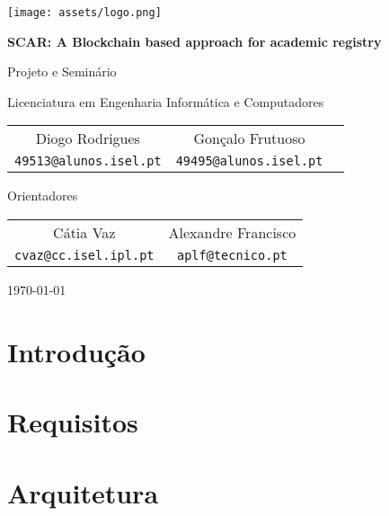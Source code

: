 \documentclass[10pt]{article}
\begin{document}
\begin{center}

\texttt{[image: assets/logo.png]}

\begin{LARGE}
\textbf{SCAR: A Blockchain based approach for academic registry}
\end{LARGE}

\vspace{.75cm} Projeto e Seminário

\vspace{.25cm} Licenciatura em Engenharia Informática e Computadores

\vspace{.75cm}
\begin{large}
\begin{tabular}{ c c c }
Diogo Rodrigues & Gonçalo Frutuoso \\
\texttt{49513@alunos.isel.pt} & \texttt{49495@alunos.isel.pt} \\
\end{tabular}

\vspace{.75cm} Orientadores \vspace{0.25cm}

\begin{tabular}{ c c }
Cátia Vaz & Alexandre Francisco \\
\texttt{cvaz@cc.isel.ipl.pt} & \texttt{aplf@tecnico.pt}
\end{tabular}
\end{large}

\vspace{.75cm} \today \vspace{.75cm}

\end{center}

\section{Introdução}



\section{Requisitos}


\section{Arquitetura}

\pagebreak
\end{document}
